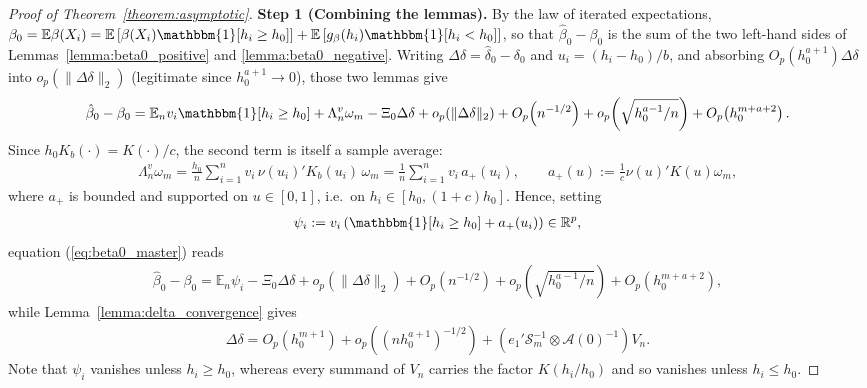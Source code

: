 \documentclass{article}
\newcommand{\normm}[1]{\lVert#1\rVert}
\newcommand{\E}{\mathbb{E}}
\newcommand{\R}{\mathbb{R}}
\newcommand{\I}{\mathbbm{1}}
\begin{document}
\begin{appendices}
\begin{proof}[Proof of Theorem~\ref{theorem:asymptotic}]
\textbf{Step 1 (Combining the lemmas).}
By the law of iterated expectations,
$\beta_0=\E\beta(X_i)=\E\left[\beta(X_i)\I[h_i\ge h_0]\right]
+\E\left[g_\beta(h_i)\I[h_i<h_0]\right]$, so that $\hat\beta_0-\beta_0$ is the
sum of the two left-hand sides of Lemmas~\ref{lemma:beta0_positive} and
\ref{lemma:beta0_negative}. Writing $\Delta\delta=\hat\delta_0-\delta_0$ and
$u_i=(h_i-h_0)/b$, and absorbing $O_p(h_0^{a+1})\Delta\delta$ into
$o_p(\normm{\Delta\delta}_2)$ (legitimate since $h_0^{a+1}\to0$), those two
lemmas give
\begin{align}\label{eq:beta0_master}
    \hat{\beta}_0 - \beta_0
    = \E_n v_i\I[h_i\geq h_0] + \Lambda_n^{v}\omega_m - \Xi_0\Delta\delta
      + o_p\!\left(\normm{\Delta\delta}_2\right)
      + O_p\!\left(n^{-1/2}\right)
      + o_p\!\left(\sqrt{h_0^{a-1}/n}\right)
      + O_p\!\left(h_0^{m+a+2}\right).
\end{align}
Since $h_0K_b(\cdot)=K(\cdot)/c$, the second term is itself a sample average:
\begin{align*}
    \Lambda_n^{v}\omega_m
    = \frac{h_0}{n}\sum_{i=1}^n v_i\,\nu(u_i)'K_b(u_i)\,\omega_m
    = \frac{1}{n}\sum_{i=1}^n v_i\,a_{+}(u_i),
    \qquad a_{+}(u):=\frac{1}{c}\nu(u)'K(u)\omega_m ,
\end{align*}
where $a_{+}$ is bounded and supported on $u\in[0,1]$, i.e.\ on
$h_i\in[h_0,(1+c)h_0]$. Hence, setting
\begin{align}\label{eq:psi_def}
    \psi_i := v_i\left(\I[h_i\geq h_0]+a_{+}(u_i)\right)\in\R^{p},
\end{align}
equation (\ref{eq:beta0_master}) reads
\begin{align}\label{eq:beta0_master2}
    \hat{\beta}_0 - \beta_0
    = \E_n\psi_i - \Xi_0\Delta\delta
      + o_p\!\left(\normm{\Delta\delta}_2\right)
      + O_p\!\left(n^{-1/2}\right)
      + o_p\!\left(\sqrt{h_0^{a-1}/n}\right)
      + O_p\!\left(h_0^{m+a+2}\right),
\end{align}
while Lemma~\ref{lemma:delta_convergence} gives
\begin{align}\label{eq:delta_master}
    \Delta\delta
    = O_p\!\left(h_0^{m+1}\right) + o_p\!\left((nh_0^{a+1})^{-1/2}\right)
      + \left(e_1'\mathcal{S}_m^{-1}\otimes \mathcal{A}(0)^{-1}\right)V_n .
\end{align}
Note that $\psi_i$ vanishes unless $h_i\ge h_0$, whereas every summand of $V_n$
carries the factor $K(h_i/h_0)$ and so vanishes unless $h_i\le h_0$.
 


\end{proof}
\end{appendices}
\end{document}
